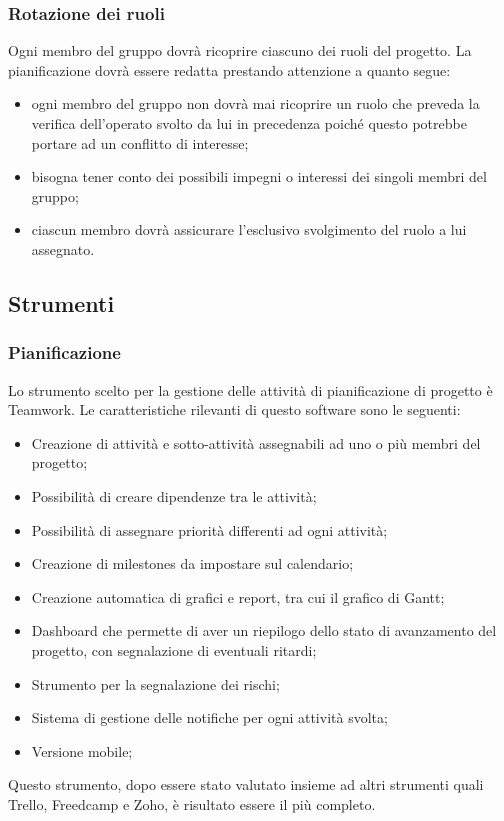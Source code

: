 \documentclass[../NormeProgetto.tex]{subfiles}
\begin{document}
		\subsubsection{Rotazione dei ruoli}
		Ogni membro del gruppo dovrà ricoprire ciascuno dei ruoli del progetto. La pianificazione dovrà essere redatta prestando attenzione a quanto segue:
		\begin{itemize}
			\item ogni membro del gruppo non dovrà mai ricoprire un ruolo che preveda la verifica dell'operato svolto da lui in precedenza poiché questo potrebbe portare ad un conflitto di interesse;
			\item bisogna tener conto dei possibili impegni o interessi dei singoli membri del gruppo;
			\item ciascun membro dovrà assicurare l'esclusivo svolgimento del ruolo a lui assegnato.
		\end{itemize}				
		
		\subsection{Strumenti}
		
		\subsubsection{Pianificazione} \label{sec: Pianificazione Teamwork}
		Lo strumento scelto per la gestione delle attività di pianificazione di progetto è Teamwork. Le caratteristiche rilevanti di questo software sono le seguenti:
		\begin{itemize}
		\item Creazione di attività e sotto-attività assegnabili ad uno o più membri del progetto;
		\item Possibilità di creare dipendenze tra le attività;
		\item Possibilità di assegnare priorità differenti ad ogni attività;
		\item Creazione di milestones da impostare sul calendario;
		\item Creazione automatica di grafici e report, tra cui il grafico di Gantt;
		\item Dashboard che permette di aver un riepilogo dello stato di avanzamento del progetto, con segnalazione di eventuali ritardi;
		\item Strumento per la segnalazione dei rischi;
		\item Sistema di gestione delle notifiche per ogni attività svolta;
		\item Versione mobile;
		\end{itemize}		 
Questo strumento, dopo essere stato valutato insieme ad altri strumenti quali Trello, Freedcamp e Zoho, è risultato essere il più completo.
		
\end{document}
